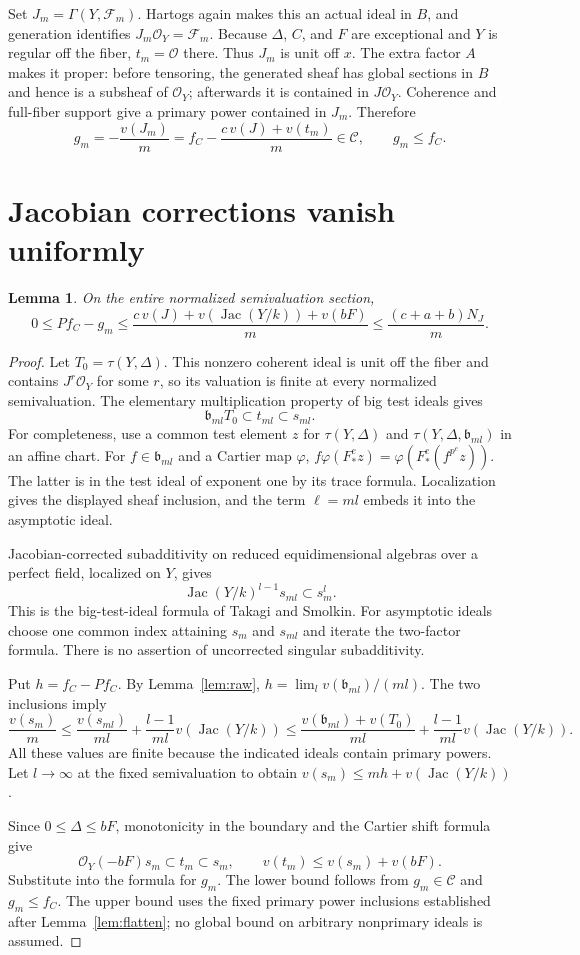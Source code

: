 \documentclass[11pt]{article}
\newtheorem{lemma}[theorem]{Lemma}
\newcommand{\OO}{\mathcal O}
\newcommand{\CC}{\mathcal C}
\newcommand{\Jac}{\operatorname{Jac}}
\begin{document}
Set $J_m=\Gamma(Y,\mathscr F_m)$. Hartogs again makes this an actual ideal
in $B$, and generation identifies $J_m\OO_Y=\mathscr F_m$.
Because $\Delta$, $C$, and $F$ are exceptional and $Y$ is regular off the
fiber, $t_m=\OO$ there. Thus $J_m$ is unit off $x$. The extra factor $A$
makes it proper: before tensoring, the generated sheaf has global sections
in $B$ and hence is a subsheaf of $\OO_Y$; afterwards it is contained in
$J\OO_Y$. Coherence and full-fiber support give a primary power contained
in $J_m$. Therefore
\[
 g_m=-\frac{v(J_m)}m
     =f_C-\frac{c\,v(J)+v(t_m)}m\in\CC,
 \qquad g_m\leq f_C.
\]

\section{Jacobian corrections vanish uniformly}
\begin{lemma}\label{lem:estimate}
On the entire normalized semivaluation section,
\[
 0\leq P f_C-g_m
 \leq\frac{c\,v(J)+v(\Jac(Y/k))+v(bF)}m
 \leq\frac{(c+a+b)N_J}m.
\]
\end{lemma}
\begin{proof}
Let $T_0=\tau(Y,\Delta)$. This nonzero coherent ideal is unit off the
fiber and contains $J^r\OO_Y$ for some $r$, so its valuation is finite
at every normalized semivaluation.
The elementary multiplication property of big test ideals gives
\[
 \mathfrak b_{m l}T_0\subset t_{m l}\subset s_{m l}.
\]
For completeness, use a common test element $z$ for $\tau(Y,\Delta)$
and $\tau(Y,\Delta,\mathfrak b_{ml})$ in an affine chart.
For $f\in\mathfrak b_{ml}$ and a Cartier map $\varphi$,
$f\varphi(F_*^e z)=\varphi(F_*^e(f^{p^e}z))$.
The latter is in the test ideal of exponent one by its trace formula.
Localization gives the displayed sheaf inclusion, and the term
$\ell=ml$ embeds it into the asymptotic ideal.

Jacobian-corrected subadditivity on reduced equidimensional algebras over
a perfect field, localized on $Y$, gives
\[
 \Jac(Y/k)^{l-1}s_{ml}\subset s_m^l.
\]
This is the big-test-ideal formula of Takagi and Smolkin. For asymptotic
ideals choose one common index attaining $s_m$ and $s_{ml}$ and iterate
the two-factor formula. There is no assertion of uncorrected singular
subadditivity.

Put $h=f_C-Pf_C$. By Lemma~\ref{lem:raw},
$h=\lim_l v(\mathfrak b_{ml})/(ml)$. The two inclusions imply
\[
 \frac{v(s_m)}m
 \leq\frac{v(s_{ml})}{ml}
       +\frac{l-1}{ml}v(\Jac(Y/k))
 \leq\frac{v(\mathfrak b_{ml})+v(T_0)}{ml}
       +\frac{l-1}{ml}v(\Jac(Y/k)).
\]
All these values are finite because the indicated ideals contain primary
powers. Let $l\to\infty$ at the fixed semivaluation to obtain
$v(s_m)\leq mh+v(\Jac(Y/k))$.

Since $0\leq\Delta\leq bF$, monotonicity in the boundary and the Cartier
shift formula give
\[
 \OO_Y(-bF)s_m\subset t_m\subset s_m,
 \qquad v(t_m)\leq v(s_m)+v(bF).
\]
Substitute into the formula for $g_m$. The lower bound follows from
$g_m\in\CC$ and $g_m\leq f_C$. The upper bound uses the fixed primary
power inclusions established after Lemma~\ref{lem:flatten}; no global
bound on arbitrary nonprimary ideals is assumed.
\end{proof}
\end{document}
